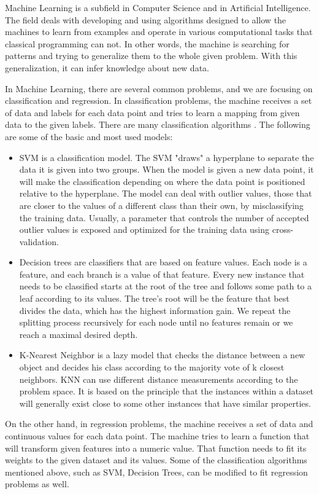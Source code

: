 \documentclass[../main.tex]{subfiles}
\begin{document}
Machine Learning is a subfield in Computer Science and in Artificial Intelligence. 
The field deals with developing and using algorithms designed to allow the machines to 
learn from examples and operate in various computational tasks that classical programming can not. 
In other words, the machine is searching for patterns and trying to generalize them to 
the whole given problem. With this generalization, it can infer knowledge about new data.
\par
 
In Machine Learning, there are several common problems, and we are focusing on classification 
and regression.
In classification problems, the machine receives a set of data and labels for each data point and 
tries to learn a mapping from given data to the given labels. 
There are many classification algorithms \cite{machine_learning_classification_algorithms}. The following are some of the basic and most 
used models:
\begin{itemize}
    \item SVM is a classification model. The SVM "draws" a hyperplane to separate the data it is given into two groups.
        When the model is given a new data point, it will make the classification depending on where the data point is positioned
        relative to the hyperplane. The model can deal with outlier values, those that are closer to the values of a different class than their own,
        by misclassifying the training data. Usually, a parameter that controls the number of accepted outlier values is exposed and optimized for
        the training data using cross-validation.
    \item Decision trees are classifiers that are based on feature values. Each node is a feature, and each branch is a value of that feature.
        Every new instance that needs to be classified starts at the root of the tree and follows some path to a leaf according to its values.
        The tree's root will be the feature that best divides the data, which has the highest information gain.
        We repeat the splitting process recursively for each node until no features remain or we reach a maximal desired depth.
    \item K-Nearest Neighbor is a lazy model that checks the distance between a new object and decides his class according
        to the majority vote of k closest neighbors. KNN can use different distance measurements according to the problem space.
        It is based on the principle that the instances within a dataset will generally exist close to some other instances that have
        similar properties.
\end{itemize}
On the other hand, in regression problems, the machine receives a set of data and continuous values for 
each data point. The machine tries to learn a function that will transform given features into a 
numeric value. That function needs to fit its weights to the given dataset and its values. 
Some of the classification algorithms mentioned above, such as SVM, Decision Trees, can be 
modified to fit regression problems as well.
\end{document}
